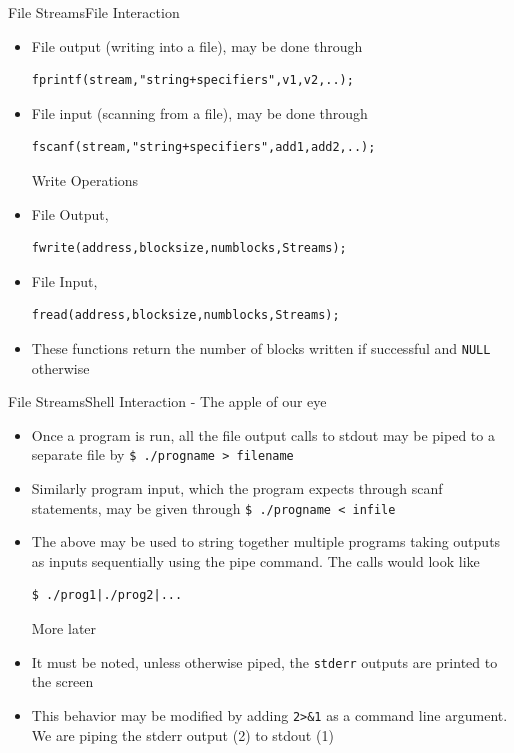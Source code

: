 \documentclass{beamer}
\begin{document}
\begin{frame}[fragile]{File Streams}{File Interaction}
\begin{itemize}
\begin{block}{Stream Operations}
\end{block}
\item File output (writing into a file), may be done through
\begin{verbatim}
fprintf(stream,"string+specifiers",v1,v2,..);
\end{verbatim}
\item File input (scanning from a file), may be done through
\begin{verbatim}
fscanf(stream,"string+specifiers",add1,add2,..);
\end{verbatim}
\begin{block}{Write Operations}
\end{block}
\item File Output,
\begin{verbatim}
fwrite(address,blocksize,numblocks,Streams);
\end{verbatim}
\item File Input,
\begin{verbatim}
fread(address,blocksize,numblocks,Streams);
\end{verbatim}
\item These functions return the number of blocks written if successful and \verb|NULL| otherwise
\end{itemize}
\end{frame}

\begin{frame}[fragile]{File Streams}{Shell Interaction - The apple of our eye}
\begin{itemize}
\item Once a program is run, all the file output calls to stdout may be piped to a separate file by \verb|$ ./progname > filename|
\item Similarly program input, which the program expects through scanf statements, may be given through \verb|$ ./progname < infile|
\item The above may be used to string together multiple programs taking outputs as inputs sequentially using the pipe command. The calls would look like 
\begin{verbatim}
$ ./prog1|./prog2|...
\end{verbatim}\begin{small}
More later
\end{small}
\item It must be noted, unless otherwise piped, the \verb|stderr| outputs are printed to the screen
\item This behavior may be modified by adding \verb|2>&1| as a command line argument. We are piping the stderr output (2) to stdout (1)
\end{itemize}
\end{frame}
\end{document}
